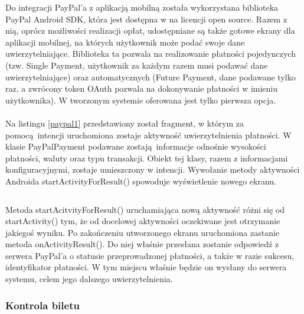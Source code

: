 Do integracji PayPal'a z aplikacją mobilną została wykorzystana biblioteka PayPal Android SDK, która jest dostępna w na licencji open source. Razem z nią, oprócz możliwości realizacji opłat, udostępniane są także gotowe ekrany dla aplikacji mobilnej, na których użytkownik może podać swoje dane uwierzytelniające. Biblioteka ta pozwala na realizowanie płatności pojedynczych (tzw. Single Payment, użytkownik za każdym razem musi podawać dane uwierzytelniające) oraz automatycznych (Future Payment, dane podawane tylko raz, a zwrócony token OAuth pozwala na dokonywanie płatności w imieniu użytkownika). W tworzonym systemie oferowana jest tylko pierwsza opcja.
\\
\\
Na listingu \ref{paypal1} przedstawiony został fragment, w którym za pomocą intencji uruchomiona zostaje aktywność uwierzytelnienia płatności. W klasie PayPalPayment podawane zostają informacje odnośnie wysokości płatności, waluty oraz typu transakcji. Obiekt tej klasy, razem z informacjami konfiguracyjnymi, zostaje umieszczony w intencji. Wywołanie metody aktywności Androida startActivityForResult() spowoduje wyświetlenie nowego ekranu.

\begin{singlespace}
	\label{paypal1}
	\vspace{0.3cm}
	\inputminted[fontsize=\footnotesize, linenos=true]{java}{src/imp/get-payment.java}
\end{singlespace}

\vspace{0.3cm}

Metoda startAcitvityForResult() uruchamiająca nową aktywność różni się od startActivity() tym, że od docelowej aktywności oczekiwane jest otrzymanie jakiegoś wyniku. Po zakończeniu utworzonego ekranu uruchomiona zastanie metoda onActivityResult(). Do niej właśnie przesłana zostanie odpowiedź z serwera PayPal'a o statusie przeprowadzonej płatności, a także w razie sukcesu, identyfikator płatności. W tym miejscu właśnie będzie on wysłany do serwera systemu, celem jego dalszego uwierzytelnienia.

\subsubsection*{Kontrola biletu}

